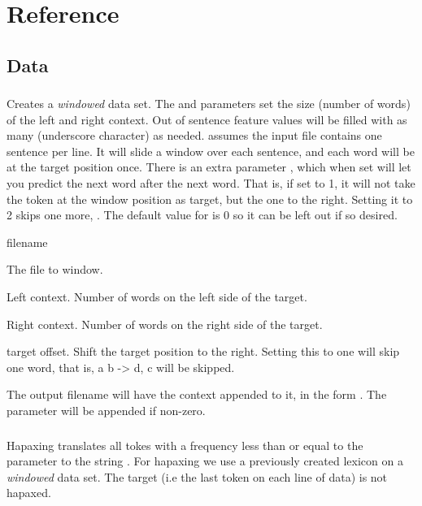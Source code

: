 \documentclass[a4paper,10pt,twoside]{report}
\begin{document}
\chapter{Reference}

\section{Data}

\subsection{}

Creates a \emph{windowed} data set. The  and 
parameters set the size (number of words) of the left and right
context. Out of sentence feature values will be filled with as many
\cmp{\_} (underscore character) as needed. \Wopr{} assumes the input
file contains one sentence per line. It will slide a window over each
sentence, and each word will be at the target position once. There is
an extra parameter , which when set will let you predict the
next word after the next word. That is, if set to \num{1}, it will not
take the token at the window position as target, but the one to the
right. Setting it to \num{2} skips one more, \etc{}. The default value
for  is 0 so it can be left out if so desired.

\begin{varlist}{filename}
\item[filename] The file to window.
\item[lc] Left context. Number of words on the left side of the target.
\item[rc] Right context. Number of words on the right side of the target.
\item[to] target offset. Shift the target position to the right. Setting this to
  one will skip one word, that is, a b -> d, c will be skipped.
\end{varlist}

The output filename will have the context appended to it, in the form
. The  parameter will be appended if non-zero.

\subsection{}

Hapaxing translates all tokes with a frequency less than or equal to
the  parameter to the string . For hapaxing we use
a previously created lexicon on a \emph{windowed} data set. The target
(i.e the last token on each line of data) is not hapaxed.
\end{document}
